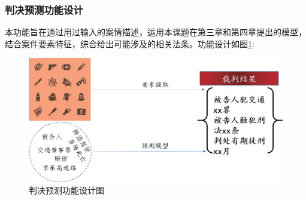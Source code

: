
\subsubsection{判决预测功能设计}
本功能旨在通过用过输入的案情描述，运用本课题在第三章和第四章提出的模型，结合案件要素特征，综合给出可能涉及的相关法条。功能设计如图\ref{fig:sys_picture}:
\begin{figure}[htbp]%
    \centering
    \includegraphics[scale=0.5, clip=true]{./sources/sys_picture.eps}
    \caption{\label{fig:sys_picture}判决预测功能设计图}
\end{figure}



